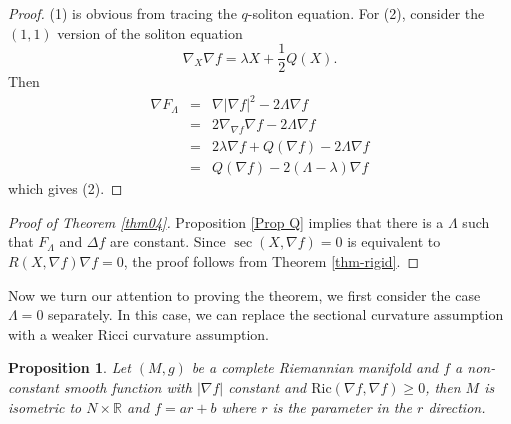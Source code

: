 \documentclass{amsart}
\theoremstyle{plain}
\newtheorem{proposition}[theorem]{\bf Proposition}
\numberwithin{equation}{section}
\begin{document}
\begin{proof}
(1) is obvious from tracing the $q$-soliton equation.  For (2), consider the $(1,1)$ version of the soliton equation
\[ \nabla_X \nabla f = \lambda X + \frac{1}{2} Q(X).\]
Then
\begin{eqnarray*}
    \nabla F_{\Lambda} & =& \nabla |\nabla f|^2 - 2 \Lambda \nabla f \\&=&  2 \nabla_{\nabla f} \nabla f - 2 \Lambda \nabla f \\
    &=& 2 \lambda \nabla f + Q(\nabla f)  - 2 \Lambda \nabla f \\
    &=& Q(\nabla f) - 2 (\Lambda - \lambda)\nabla f
\end{eqnarray*}
which gives (2). 
\end{proof}

\begin{proof}[Proof of Theorem \ref{thm04}]
    Proposition \ref{Prop Q} implies that there is a $\Lambda$ such that  $F_{\Lambda}$ and $\Delta f$ are constant. Since $\sec(X,\nabla f)=0$ is equivalent to $R(X,\nabla f)\nabla f=0$, the proof follows from Theorem \ref{thm-rigid}.
\end{proof}

Now we turn our attention to proving the theorem, we first consider the case $\Lambda =0$ separately.  In this case, we can replace the sectional curvature assumption with a weaker 
Ricci curvature assumption. 

\begin{proposition} \label{prop-rigid-0}
    Let $(M,g)$ be a complete Riemannian manifold and $f$ a non-constant smooth function with $|\nabla f|$ constant and $\mathrm{Ric}(\nabla f, \nabla f) \geq 0$, then $M$ is isometric to $N \times \mathbb{R}$ and $f =ar+b$ where $r$ is the parameter in the $r$ direction. 
\end{proposition}
\end{document}
